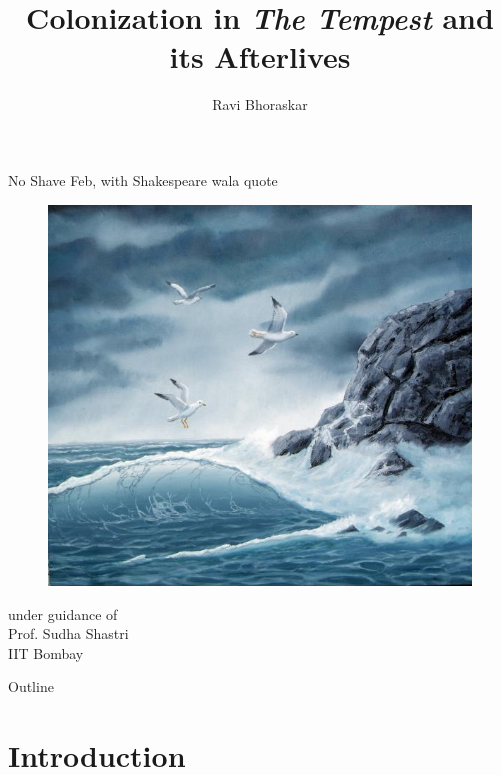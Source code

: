 \documentclass{beamer}
\title[The Tempest \hspace{15em} \insertframenumber / \inserttotalframenumber]{Colonization in \emph{The Tempest} and its Afterlives}
\author {Ravi Bhoraskar}
\begin{document}
\begin{frame}[plain]
  No Shave Feb, with Shakespeare wala quote
\end{frame}
\begin{frame}[plain]
\titlepage
\begin{center}
\begin{figure}[htp]
  \begin{center}
    \centering
    \includegraphics[scale=0.17]{title.jpg}
  \end{center}
\end{figure}
under guidance of\\
Prof. Sudha Shastri\\
IIT Bombay
\end{center}
\end{frame}
\begin{frame}{Outline}
  \begin{multicols}{2}
  \tableofcontents  
  \end{multicols}
\end{frame}
\section{Introduction}
\end{document}
